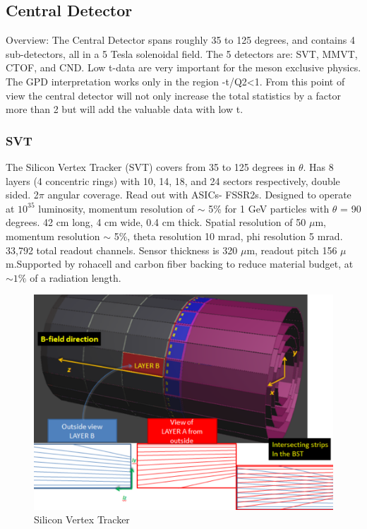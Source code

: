     \subsection{Central Detector}
        Overview: The Central Detector spans roughly 35 to 125 degrees, and contains 4 sub-detectors, all in a 5 Tesla solenoidal field. The 5 detectors are: SVT, MMVT, CTOF, and CND. 
        Low t-data are very important for the meson exclusive physics. The GPD interpretation works only in the region -t/Q2<1. From this point of view the central detector will not only increase the total statistics by a factor more than 2 but will add the valuable data with low t.


        \subsubsection{SVT}
            The Silicon Vertex Tracker (SVT) covers from 35 to 125 degrees in $\theta$. Has 8 layers (4 concentric rings) with 10, 14, 18, and 24 sectors respectively, double sided. 2$\pi$ angular coverage. Read out with ASICs- FSSR2s. Designed to operate at $10^{35}$ luminosity, momentum resolution of $\sim$ 5\% for 1 GeV particles with $\theta$ = 90 degrees. 42 cm long, 4 cm wide, 0.4 cm thick. Spatial resolution of 50 $\mu$m, momentum resolution $\sim$ 5\%, theta resolution 10 mrad, phi resolution 5 mrad.  33,792 total readout channels. Sensor thickness is 320 $\mu$m, readout pitch 156 $\mu$ m.Supported by rohacell and carbon fiber backing to reduce material budget, at $\sim 1\%$ of a radiation length.
            
            \begin{figure}[H]
    			\centering
    			\includegraphics[width=12cm]{Chapters/Ch2-Experiment/clas-12-system/pics/cd/svt.PNG}
    			\caption{Silicon Vertex Tracker}
			\end{figure}  
			
